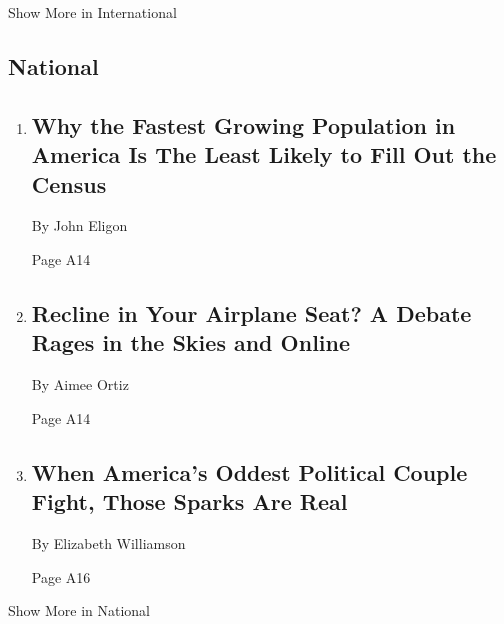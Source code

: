 Show More in International

\hypertarget{national}{%
\subsection{National}\label{national}}

\begin{enumerate}
\def\labelenumi{\arabic{enumi}.}
\item
  \href{/2020/02/14/us/asian-american-census.html}{}

  \hypertarget{why-the-fastest-growing-population-in-america-is-the-least-likely-to-fill-out-the-census}{%
  \subsection{Why the Fastest Growing Population in America Is The Least
  Likely to Fill Out the
  Census}\label{why-the-fastest-growing-population-in-america-is-the-least-likely-to-fill-out-the-census}}

  By John Eligon

  Page A14
\item
  \href{/2020/02/15/travel/airplane-seat-recline-video.html}{}

  \hypertarget{recline-in-your-airplane-seat-a-debate-rages-in-the-skies-and-online}{%
  \subsection{Recline in Your Airplane Seat? A Debate Rages in the Skies
  and
  Online}\label{recline-in-your-airplane-seat-a-debate-rages-in-the-skies-and-online}}

  By Aimee Ortiz

  Page A14
\item
  \href{/2020/02/14/us/politics/george-and-kellyanne-conway.html}{}

  \hypertarget{when-americas-oddest-political-couple-fight-those-sparks-are-real-1}{%
  \subsection{When America's Oddest Political Couple Fight, Those Sparks
  Are
  Real}\label{when-americas-oddest-political-couple-fight-those-sparks-are-real-1}}

  By Elizabeth Williamson

  Page A16
\end{enumerate}

Show More in National


